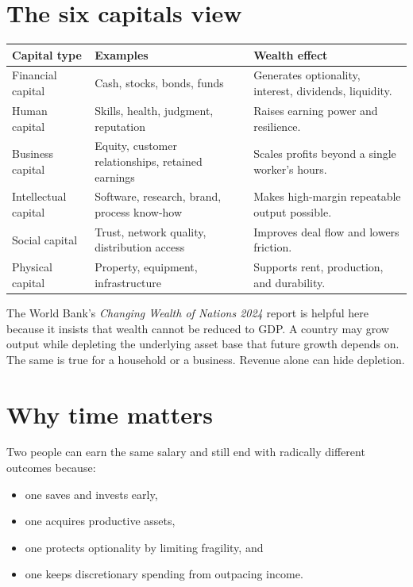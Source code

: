 \documentclass[11pt,openany]{book}
\begin{document}
\section{The six capitals view}

\begin{center}
\begin{tabularx}{\textwidth}{>{\raggedright\arraybackslash}p{}X X}
\toprule
\textbf{Capital type} & \textbf{Examples} & \textbf{Wealth effect} \\
\midrule
Financial capital & Cash, stocks, bonds, funds & Generates optionality, interest, dividends, liquidity. \\
Human capital & Skills, health, judgment, reputation & Raises earning power and resilience. \\
Business capital & Equity, customer relationships, retained earnings & Scales profits beyond a single worker's hours. \\
Intellectual capital & Software, research, brand, process know-how & Makes high-margin repeatable output possible. \\
Social capital & Trust, network quality, distribution access & Improves deal flow and lowers friction. \\
Physical capital & Property, equipment, infrastructure & Supports rent, production, and durability. \\
\bottomrule
\end{tabularx}
\end{center}

The World Bank's \textit{Changing Wealth of Nations 2024} report is helpful here because it insists that wealth cannot be reduced to GDP. A country may grow output while depleting the underlying asset base that future growth depends on. The same is true for a household or a business. Revenue alone can hide depletion.

\section{Why time matters}

Two people can earn the same salary and still end with radically different outcomes because:

\begin{itemize}
  \item one saves and invests early,
  \item one acquires productive assets,
  \item one protects optionality by limiting fragility, and
  \item one keeps discretionary spending from outpacing income.
\end{itemize}
\end{document}
